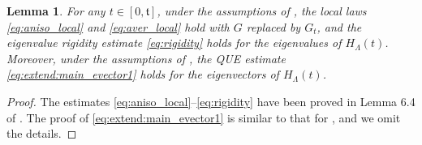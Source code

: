 \documentclass[10pt,reqno]{amsart}
\numberwithin{equation}{section}
\numberwithin{figure}{section}
\theoremstyle{plain} %
\newtheorem{lemma}[theorem]{Lemma}
\theoremstyle{definition} %
\newcommand{\ft}{{\mathfrak t}}
\numberwithin{equation}{section}
\begin{document}
\begin{lemma}\label{lem:samefort}
For any $t\in [0,\ft]$, under the assumptions of , the local laws \eqref{eq:aniso_local} and \eqref{eq:aver_local} hold with $G$ replaced by $G_t$, and the eigenvalue rigidity estimate \eqref{eq:rigidity} holds for the eigenvalues of ${H_{\Lambda}}(t)$. Moreover, under the assumptions of , the QUE estimate \eqref{eq:extend:main_evector1} holds for the eigenvectors of ${H_{\Lambda}}(t)$. 
\end{lemma}
\begin{proof}
    The estimates \eqref{eq:aniso_local}--\eqref{eq:rigidity} have been proved in Lemma 6.4 of \cite{stone2024randommatrixmodelquantum}. The proof of \eqref{eq:extend:main_evector1} is similar to that for , and we omit the details.
\end{proof}

\end{document}
